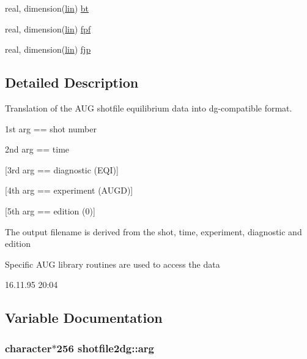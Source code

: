 \begin{CompactItemize}
\item 
real, dimension(\hyperlink{namespaceshotfile2dg_dcd8847b41f8af202e2dac58135c0113}{lin}) \hyperlink{namespaceshotfile2dg_286a74f661b48f942a47cd92a9b88012}{bt}
\item 
real, dimension(\hyperlink{namespaceshotfile2dg_dcd8847b41f8af202e2dac58135c0113}{lin}) \hyperlink{namespaceshotfile2dg_edd8eaed3b83cab69ca9550ba0792842}{fpf}
\item 
real, dimension(\hyperlink{namespaceshotfile2dg_dcd8847b41f8af202e2dac58135c0113}{lin}) \hyperlink{namespaceshotfile2dg_f6d890808a587cb1d0b5a509040ba1f4}{fjp}
\end{CompactItemize}


\subsection{Detailed Description}
Translation of the AUG shotfile equilibrium data into dg-compatible format. 

1st arg == shot number

2nd arg == time

\mbox{[}3rd arg == diagnostic (EQI)\mbox{]}

\mbox{[}4th arg == experiment (AUGD)\mbox{]}

\mbox{[}5th arg == edition (0)\mbox{]}

The output filename is derived from the shot, time, experiment, diagnostic and edition

Specific AUG library routines are used to access the data

\begin{Desc}
\item[Version:]16.11.95 20:04 \end{Desc}


\subsection{Variable Documentation}
\hypertarget{namespaceshotfile2dg_b698b727537e2ab7d94d5ec0c44b62f6}{
\subsubsection[arg]{\setlength{\rightskip}{0pt plus 5cm}character$\ast$256 {\bf shotfile2dg::arg}}}
\label{namespaceshotfile2dg_b698b727537e2ab7d94d5ec0c44b62f6}




